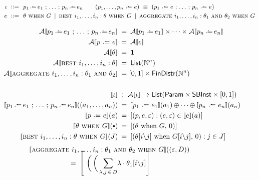 \begin{figure}
  \EquationsFigureSize
  \begin{align*}
    \InferenceStrategy \BnfDef\ & p_1 \dlassign e_1 \seq \dots \seq p_n \dlassign e_n \qquad
    (p_1, \dots, p_n \slassign e) \ \equiv\  (p_1 \slassign e \seq \dots \seq p_n \slassign e)
    \\
    e \BnfDef\ &
    \theta \slwhen G \BnfOr
    \slbest i_1, \dots, i_n : \theta \slwhen G \BnfOr
    \slaggregate i_1, \dots, i_n: \theta_1 \sland \theta_2 \slwhen G
  \end{align*}

  \begin{align*}
    \InfActionSem{p_1 \dlassign e_1 \seq \dots \seq p_n \dlassign e_n} &\DefEq  \InfActionSem{p_1 \dlassign e_1} \times \dots \times \InfActionSem{p_n \dlassign e_n} \\
    \InfActionSem{p \slassign e} &\DefEq \InfActionSem{e} \\
    \InfActionSem{\theta} &\DefEq \UnitSet \\
    \InfActionSem{\slbest i_1, \dots, i_n : \theta} &\DefEq \List{\Nats^n} \\
    \InfActionSem{\slaggregate i_1, \dots, i_n: \theta_1 \sland \theta_2} &\DefEq \EpsType \times \FDistr{\Nats^n} \\ \\
    \ValSem{\InferenceStrategy} &\;:\; \InfActionSem{\InferenceStrategy} \to \List{\Param \times \SymbBoundExpr \times
  \EpsType} \\
    \ValSem{p_1 \dlassign e_1 \seq \dots \seq p_n \dlassign e_n}((a_1, \dots, a_n)) &\DefEq
      \ValSem{p_1 \slassign e_1}(a_1) \ListCat \cdots \ListCat \ValSem{p_n \slassign e_n}(a_n) \\
    \ValSem{p \slassign e}(a) &\DefEq \ListComprehension{(p, e, \Eps)}{(e, \Eps) \in \ValSem{e}(a)} \\
    \ValSem{\theta \slwhen G}(\Unit) &\DefEq
      \ListSingleton{(\theta \WhenSymbBE G, \,0)} \\
    \ValSem{\slbest i_1, \dots, i_n : \theta \slwhen G}(J) &\DefEq
      \ListComprehension{(\FSubst{\theta}{i}{j} \WhenSymbBE \FSubst{G}{i}{j}, \, 0)}{j \in J}
  \end{align*}
  \begin{gather*}
    \ValSem{\slaggregate i_1, \dots, i_n: \theta_1 \sland \theta_2 \slwhen G}((\varepsilon, D)) \\[-2ex] \DefEq
    \ListSingleton{\
      \biggl(\,
        \biggl(\,
          \sum_{\lambda, j \,\in\, D} \! {\lambda \cdot \FSubst{\theta_1}{i}{j} }
}
\end{gather*}
\end{figure}
